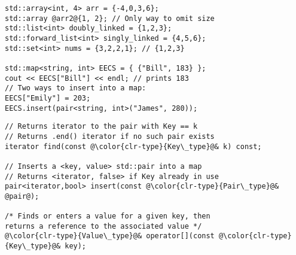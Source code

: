 \documentclass[6.6pt, twocolumn]{extarticle}
\newcommand{\myinlinewhite}[1]{\lstinline[deletekeywords = {const,override},keywordstyle=\color{white},basicstyle={\ttfamily}]{#1}}
\newcommand{\Cpp}{\texorpdfstring{\mbox{C\raisebox{.25ex}{\textsmaller[2]{++}}}\xspace}{C++}}
\begin{document}
\smallskip
\begin{minipage}[c]{5.1cm} 
   \begin{tcolorbox}[,toptitle=-0.6mm,
bottomtitle=-0.6mm,top=-4pt,bottom=-4pt,middle=-5pt,left=-7.5pt,right=0pt,,
adjusted title={ \Cpp Standard Library Containers},fonttitle=\sffamily\bfseries
   ]
              {
\begin{lstlisting}[style = mystyle]
std::array<int, 4> arr = {-4,0,3,6};
std::array @arr2@{1, 2}; // Only way to omit size
std::list<int> doubly_linked = {1,2,3};
std::forward_list<int> singly_linked = {4,5,6};
std::set<int> nums = {3,2,2,1}; // {1,2,3}

std::map<string, int> EECS = { {"Bill", 183} };
cout << EECS["Bill"] << endl; // prints 183
// Two ways to insert into a map:
EECS["Emily"] = 203;
EECS.insert(pair<string, int>("James", 280));
\end{lstlisting}
}
\end{tcolorbox} 
   \end{minipage}
   \hspace{0pt}
   \begin{minipage}[c]{5.1cm}
   \begin{tcolorbox}[,toptitle=-0.6mm,
bottomtitle=-0.6mm,top=-4pt,bottom=-4pt,middle=-5pt,left=-7.5pt,right=-0pt,,
adjusted title={ Useful \myinlinewhite{std::map} functions},fonttitle=\sffamily\bfseries
   ]
              {
    \lstset{
    escapeinside=@@,
    literate=
}
\begin{lstlisting}[style = mystyle,numbers=none]
// Returns iterator to the pair with Key == k
// Returns .end() iterator if no such pair exists
iterator find(const @\color{clr-type}{Key\_type}@& k) const;

// Inserts a <key, value> std::pair into a map
// Returns <iterator, false> if Key already in use
pair<iterator,bool> insert(const @\color{clr-type}{Pair\_type}@& @pair@);

/* Finds or enters a value for a given key, then 
returns a reference to the associated value */
@\color{clr-type}{Value\_type}@& operator[](const @\color{clr-type}{Key\_type}@& key);
\end{lstlisting}
}
\end{tcolorbox} 

\end{minipage}
\end{document}
